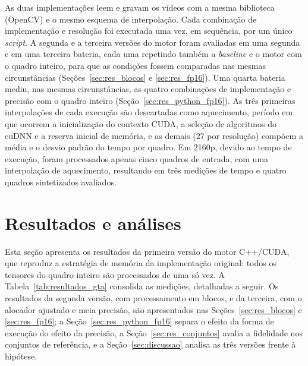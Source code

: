 \documentclass[
    12pt,                %
    openright,           %
    oneside,             %
    a4paper,             %
    english,             %
    brazil               %
]{abntex2}
\begin{document}
As duas implementações leem e gravam os vídeos com a mesma biblioteca (OpenCV) e o mesmo esquema de interpolação. Cada combinação de implementação e resolução foi executada uma vez, em sequência, por um único \textit{script}. A segunda e a terceira versões do motor foram avaliadas em uma segunda e em uma terceira bateria, cada uma repetindo também a \textit{baseline} e o motor com o quadro inteiro, para que as condições fossem comparadas nas mesmas circunstâncias (Seções~\ref{sec:res_blocos} e \ref{sec:res_fp16}). Uma quarta bateria mediu, nas mesmas circunstâncias, as quatro combinações de implementação e precisão com o quadro inteiro (Seção~\ref{sec:res_python_fp16}). As três primeiras interpolações de cada execução são descartadas como aquecimento, período em que ocorrem a inicialização do contexto CUDA, a seleção de algoritmos do cuDNN e a reserva inicial de memória, e as demais (27 por resolução) compõem a média e o desvio padrão do tempo por quadro. Em 2160p, devido ao tempo de execução, foram processados apenas cinco quadros de entrada, com uma interpolação de aquecimento, resultando em três medições de tempo e quatro quadros sintetizados avaliados.

\section{Resultados e análises}
\label{sec:resultados}

Esta seção apresenta os resultados da primeira versão do motor C++/CUDA, que reproduz a estratégia de memória da implementação original: todos os tensores do quadro inteiro são processados de uma só vez. A Tabela~\ref{tab:resultados_gta} consolida as medições, detalhadas a seguir. Os resultados da segunda versão, com processamento em blocos, e da terceira, com o alocador ajustado e meia precisão, são apresentados nas Seções~\ref{sec:res_blocos} e \ref{sec:res_fp16}; a Seção~\ref{sec:res_python_fp16} separa o efeito da forma de execução do efeito da precisão, a Seção~\ref{sec:res_conjuntos} avalia a fidelidade nos conjuntos de referência, e a Seção~\ref{sec:discussao} analisa as três versões frente à hipótese.
\end{document}
